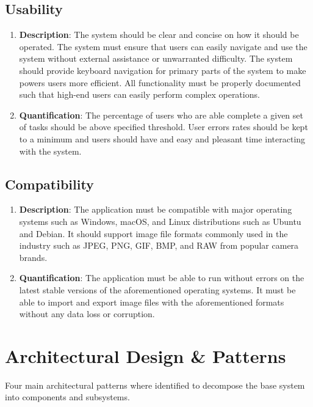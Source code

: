 \documentclass[11pt,a4paper]{article}
\begin{document}
\subsection{Usability} 
\begin{enumerate}[label*=\arabic*.]
	\item[\textbullet] {\bf Description}: The system should be clear and concise
	on how it should be operated. The system must ensure that users can easily
	navigate and use the system without external assistance or unwarranted
	difficulty. The system should provide keyboard navigation for primary parts
	of the system to make powers users more efficient. All functionality must be
	properly documented such that high-end users can easily perform complex
	operations.

	\item[\textbullet] {\bf Quantification}: The percentage of users who are
	able complete a given set of tasks should be above specified threshold. User
	errors rates should be kept to a minimum and users should have and easy and
	pleasant time interacting with the system. 
	
\end{enumerate}

\subsection{Compatibility} 
\begin{enumerate}[label*=\arabic*.]
	\item[\textbullet] {\bf Description}: The application must be compatible
	with major operating systems such as Windows, macOS, and Linux distributions
	such as Ubuntu and Debian. It should support image file formats commonly
	used in the industry such as JPEG, PNG, GIF, BMP, and RAW from popular
	camera brands.

	\item[\textbullet] {\bf Quantification}: The application must be able to run
	without errors on the latest stable versions of the aforementioned operating
	systems. It must be able to import and export image files with the
	aforementioned formats without any data loss or corruption. 
\end{enumerate}

\pagebreak

\section{Architectural Design \& Patterns}
Four main architectural patterns where identified to decompose the base system
into components and subsystems.
\end{document}
